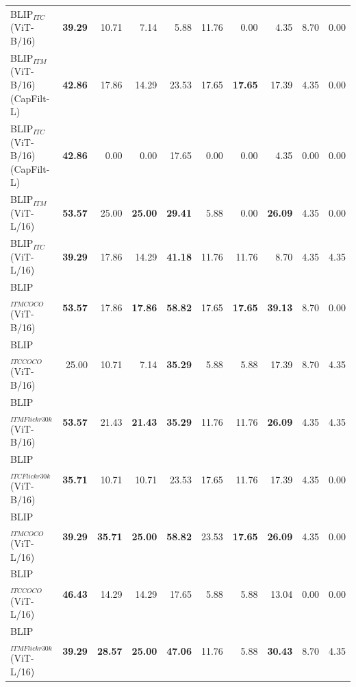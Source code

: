 \begin{table}[ht]
\begin{adjustbox}{max width=\textwidth}
\begin{tabular}{l|rrr|rrr|rrr}
 BLIP$_{ITC}$ (ViT-B/16)             & \textbf{39.29} & 10.71          & 7.14           & 5.88           & 11.76          & 0.00           & 4.35           & 8.70           & 0.00           \\
 BLIP$_{ITM}$ (ViT-B/16) (CapFilt-L) & \textbf{42.86} & 17.86          & 14.29          & 23.53          & 17.65          & \textbf{17.65} & 17.39          & 4.35           & 0.00           \\
 BLIP$_{ITC}$ (ViT-B/16) (CapFilt-L) & \textbf{42.86} & 0.00           & 0.00           & 17.65          & 0.00           & 0.00           & 4.35           & 0.00           & 0.00           \\
 BLIP$_{ITM}$ (ViT-L/16)             & \textbf{53.57} & 25.00          & \textbf{25.00} & \textbf{29.41} & 5.88           & 0.00           & \textbf{26.09} & 4.35           & 0.00           \\
 BLIP$_{ITC}$ (ViT-L/16)             & \textbf{39.29} & 17.86          & 14.29          & \textbf{41.18} & 11.76          & 11.76          & 8.70           & 4.35           & 4.35           \\
 BLIP$_{ITM COCO}$ (ViT-B/16)        & \textbf{53.57} & 17.86          & \textbf{17.86} & \textbf{58.82} & 17.65          & \textbf{17.65} & \textbf{39.13} & 8.70           & 0.00           \\
 BLIP$_{ITC COCO}$ (ViT-B/16)        & 25.00          & 10.71          & 7.14           & \textbf{35.29} & 5.88           & 5.88           & 17.39          & 8.70           & 4.35           \\
 BLIP$_{ITM Flickr30k}$ (ViT-B/16)   & \textbf{53.57} & 21.43          & \textbf{21.43} & \textbf{35.29} & 11.76          & 11.76          & \textbf{26.09} & 4.35           & 4.35           \\
 BLIP$_{ITC Flickr30k}$ (ViT-B/16)   & \textbf{35.71} & 10.71          & 10.71          & 23.53          & 17.65          & 11.76          & 17.39          & 4.35           & 0.00           \\
 BLIP$_{ITM COCO}$ (ViT-L/16)        & \textbf{39.29} & \textbf{35.71} & \textbf{25.00} & \textbf{58.82} & 23.53          & \textbf{17.65} & \textbf{26.09} & 4.35           & 0.00           \\
 BLIP$_{ITC COCO}$ (ViT-L/16)        & \textbf{46.43} & 14.29          & 14.29          & 17.65          & 5.88           & 5.88           & 13.04          & 0.00           & 0.00           \\
 BLIP$_{ITM Flickr30k}$ (ViT-L/16)   & \textbf{39.29} & \textbf{28.57} & \textbf{25.00} & \textbf{47.06} & 11.76          & 5.88           & \textbf{30.43} & 8.70           & 4.35           \\

\end{tabular}
\end{adjustbox}
\end{table}
